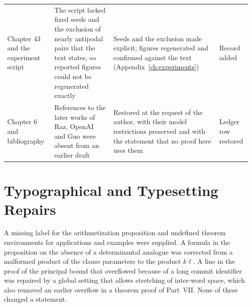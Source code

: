 \documentclass[11pt,letterpaper]{report}
\theoremstyle{plain}
\theoremstyle{definition}
\theoremstyle{remark}
\begin{document}
\begin{longtable}{>{\raggedright\arraybackslash}p{}>{\raggedright\arraybackslash}p{}>{\raggedright\arraybackslash}p{}>{\raggedright\arraybackslash}p{}}
Chapter 43 and the experiment script & The script lacked fixed seeds and the exclusion of nearly antipodal pairs that the text states, so reported figures could not be regenerated exactly & Seeds and the exclusion made explicit; figures regenerated and confirmed against the text (Appendix~\ref{ch:experiments}) & Record added\\
Chapter 6 and bibliography & References to the later works of Raz, OpenAI and Guo were absent from an earlier draft & Restored at the request of the author, with their model restrictions preserved and with the statement that no proof here uses them & Ledger row restored\\
\hline
\end{longtable}

\section{Typographical and Typesetting Repairs}

A missing label for the arithmetization proposition and undefined theorem environments for applications and examples were supplied. A formula in the proposition on the absence of a determinantal analogue was corrected from a malformed product of the clause parameters to the product $k\ell$. A line in the proof of the principal bound that overflowed because of a long commit identifier was repaired by a global setting that allows stretching of inter-word space, which also removed an earlier overflow in a theorem proof of Part~VII. None of these changed a statement.
\end{document}
